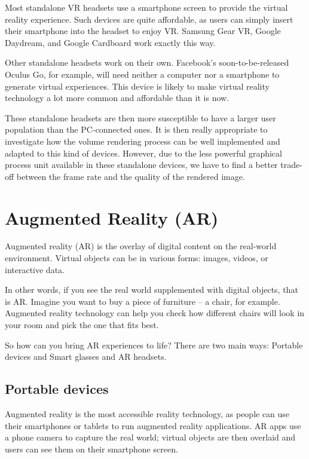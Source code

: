Most standalone VR headsets use a smartphone screen to provide the virtual reality experience. Such devices are quite affordable, as users can simply insert their smartphone into the headset to enjoy VR. Samsung Gear VR, Google Daydream, and Google Cardboard work exactly this way.

Other standalone headsets work on their own. Facebook's soon-to-be-released Oculus Go, for example, will need neither a computer nor a smartphone to generate virtual experiences. This device is likely to make virtual reality technology a lot more common and affordable than it is now.

These standalone headsets are then more susceptible to have a larger user population than the PC-connected ones. It is then really appropriate to investigate how the volume rendering process can be well implemented and adapted to this kind of devices. However, due to the less powerful graphical process unit available in these standalone devices, we have to find a better trade-off between the frame rate and the quality of the rendered image. 


\section{ Augmented Reality (AR)}

Augmented reality (AR) is the overlay of digital content on the real-world environment. Virtual objects can be in various forms: images, videos, or interactive data.


In other words, if you see the real world supplemented with digital objects, that is AR. Imagine you want to buy a piece of furniture – a chair, for example. Augmented reality technology can help you check how different chairs will look in your room and pick the one that fits best.


So how can you bring AR experiences to life? There are two main ways: Portable devices and Smart glasses and AR headsets. 


\subsection{Portable devices}

Augmented reality is the most accessible reality technology, as people can use their smartphones or tablets to run augmented reality applications. AR apps use a phone camera to capture the real world; virtual objects are then overlaid and users can see them on their smartphone screen.


